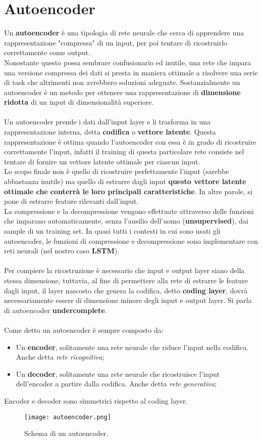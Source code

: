 \section{Autoencoder}
Un \textbf{autoencoder} è una tipologia di rete neurale che cerca di apprendere una rappresentazione "compressa" di un input, per poi tentare di ricostruirlo correttamente come output.\\
Nonostante questo possa sembrare confusionario ed inutile, una rete che impara una versione compressa dei dati si presta in maniera ottimale a risolvere una serie di task che altrimenti non avrebbero soluzioni adeguate. Sostanzialmente un autoencoder è un metodo per ottenere una rappresentazione di \textbf{dimensione ridotta} di un input di dimensionalità superiore.\\
\\
Un autoencoder prende i dati dall'input layer e li trasforma in una rappresentazione interna, detta \textbf{codifica} o \textbf{vettore latente}. Questa rappresentazione è ottima quando l'autoencoder con essa è in grado di ricostruire correttamente l'input, infatti il training di questa particolare rete consiste nel tentare di fornire un vettore latente ottimale per ciascun input.\\
Lo scopo finale non è quello di ricostruire perfettamente l'input (sarebbe abbastanza inutile) ma quello di estrarre dagli input \textbf{questo vettore latente ottimale che conterrà le loro principali caratteristiche}. In altre parole, si pone di estrarre feature rilevanti dall'input.\\
La compressione e la decompressione vengono effettuate attraverso delle funzioni che imparano automaticamente, senza l'ausilio dell'uomo (\textbf{unsupervised}), dai sample di un training set. In quasi tutti i contesti in cui sono usati gli autoencoder, le funzioni di compressione e decompressione sono implementare con reti neurali (nel nostro caso \textbf{LSTM}).\\
\\
Per compiere la ricostruzione è necessario che input e output layer siano della stessa dimensione, tuttavia, al fine di permettere alla rete di estrarre le feature dagli input, il layer nascosto che genera la codifica, detto \textbf{coding layer}, dovrà necessariamente essere di dimensione minore degli input e output layer. Si parla di autoencoder \textbf{undercomplete}.\\
\\
Come detto un autoencoder è sempre composto da:
\begin{itemize}
	\item Un \textbf{encoder}, solitamente una rete neurale che riduce l'input nella codifica. Anche detta \textit{rete ricognitiva};
	\item Un \textbf{decoder}, solitamente una rete neurale che ricostruisce l'input dell'encoder a partire dalla codifica. Anche detta \textit{rete generativa};
\end{itemize}
Encoder e decoder sono simmetrici rispetto al coding layer.
\begin{figure}[H]
	\centering
	\texttt{[image: autoencoder.png]}
	\caption{Schema di un autoencoder.}
	\label{fig:autoencoder}
\end{figure}

